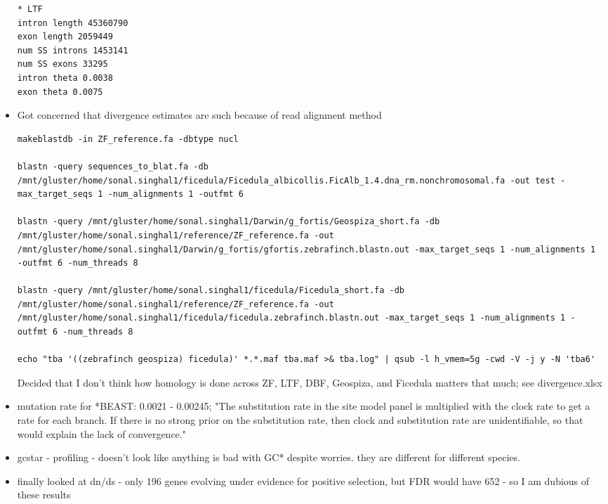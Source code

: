 \documentclass[idxtotoc,hyperref,openany,oneside]{labbook} %
\begin{document}
\begin{itemize}
\begin{verbatim}
* LTF
intron length 45360790
exon length 2059449
num SS introns 1453141
num SS exons 33295
intron theta 0.0038
exon theta 0.0075
\end{verbatim}
\item Got concerned that divergence estimates are such because of read alignment method
\begin{verbatim}
makeblastdb -in ZF_reference.fa -dbtype nucl

blastn -query sequences_to_blat.fa -db /mnt/gluster/home/sonal.singhal1/ficedula/Ficedula_albicollis.FicAlb_1.4.dna_rm.nonchromosomal.fa -out test -max_target_seqs 1 -num_alignments 1 -outfmt 6

blastn -query /mnt/gluster/home/sonal.singhal1/Darwin/g_fortis/Geospiza_short.fa -db /mnt/gluster/home/sonal.singhal1/reference/ZF_reference.fa -out /mnt/gluster/home/sonal.singhal1/Darwin/g_fortis/gfortis.zebrafinch.blastn.out -max_target_seqs 1 -num_alignments 1 -outfmt 6 -num_threads 8

blastn -query /mnt/gluster/home/sonal.singhal1/ficedula/Ficedula_short.fa -db /mnt/gluster/home/sonal.singhal1/reference/ZF_reference.fa -out /mnt/gluster/home/sonal.singhal1/ficedula/ficedula.zebrafinch.blastn.out -max_target_seqs 1 -num_alignments 1 -outfmt 6 -num_threads 8

echo "tba '((zebrafinch geospiza) ficedula)' *.*.maf tba.maf >& tba.log" | qsub -l h_vmem=5g -cwd -V -j y -N 'tba6'
\end{verbatim}
Decided that I don't think how homology is done across ZF, LTF, DBF, Geospiza, and Ficedula matters that much; see divergence.xlsx
\item mutation rate for *BEAST: 0.0021 - 0.00245; "The substitution rate in the site model panel is multiplied with the clock rate to get a rate for each branch. If there is no strong prior on the substitution rate, then clock and substitution rate are unidentifiable, so that would explain the lack of convergence."
\item gcstar - profiling - doesn't look like anything is bad with GC* despite worries. they are different for different species.
\item finally looked at dn/ds - only 196 genes evolving under evidence for positive selection, but FDR would have 652 - so I am dubious of these results
\end{itemize}
\end{document}
